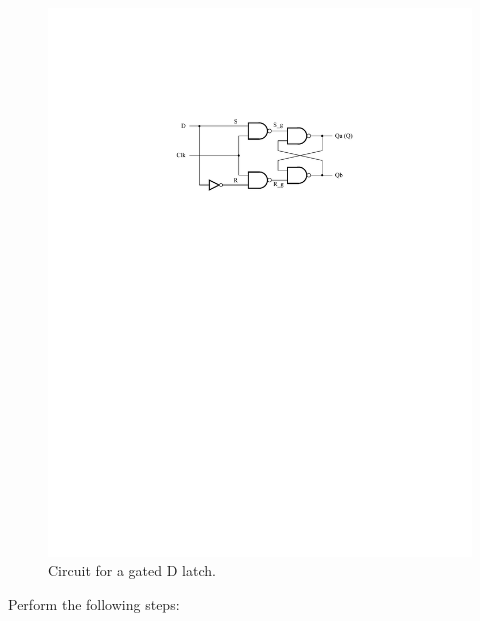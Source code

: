 \documentclass[epsfig,10pt,fullpage]{article}
\begin{document}
\begin{figure}[H]
	\begin{center}
		\includegraphics[]{figures/D_latch.pdf}
	\end{center}
	\caption{Circuit for a gated D latch.}
\label{fig:gatedD}
\end{figure}

Perform the following steps:
\end{document}
